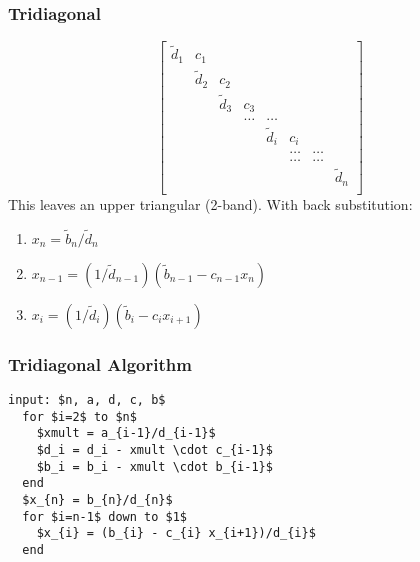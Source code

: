 \documentclass[10pt]{beamer}
\begin{document}
\begin{frame}
\frametitle{Tridiagonal}
\begin{equation*}
  \begin{bmatrix}
{\tilde{d}}_1 & c_1 &       &         &       &       &          &    \\
 & {\tilde{d}}_2 & c_2   &         &       &       &          &    \\
    & & {\tilde{d}}_3   & c_3     &       &       &          &    \\
    &     &  & \dots   & \dots &       &          &    \\
    &     &       &  & {\tilde{d}}_i   & c_{i} &          &    \\
    &     &       &         & & \dots & \dots    &    \\
    &     &       &         & & \dots & \dots    &    \\
    &     &       &         &       &       & & {\tilde{d}}_n   \\
  \end{bmatrix}
\end{equation*}
This leaves an upper triangular (2-band).  With back substitution:
\begin{enumerate}
  \item $x_n = {\tilde{b}}_n/{\tilde{d}}_n$
  \item $x_{n-1} = (1/{\tilde{d}}_{n-1})({\tilde{b}}_{n-1} - c_{n-1}x_n)$
  \item $x_{i} = (1/{\tilde{d}}_{i})({\tilde{b}}_{i} - c_{i}x_{i+1})$
\end{enumerate}
\end{frame}
\begin{frame}[fragile]
\frametitle{Tridiagonal Algorithm}
\begin{lstlisting}[mathescape]
  input: $n, a, d, c, b$
  for $i=2$ to $n$
    $xmult = a_{i-1}/d_{i-1}$
    $d_i = d_i - xmult \cdot c_{i-1}$
    $b_i = b_i - xmult \cdot b_{i-1}$
  end
  $x_{n} = b_{n}/d_{n}$
  for $i=n-1$ down to $1$
    $x_{i} = (b_{i} - c_{i} x_{i+1})/d_{i}$
  end
\end{lstlisting}


\end{frame}
\end{document}
